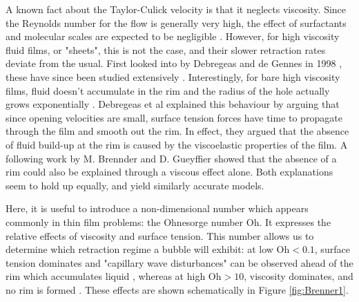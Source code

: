 \documentclass[a4paper,12pt]{article}
\numberwithin{equation}{section}
\numberwithin{figure}{section}
\numberwithin{table}{section}
\begin{document}
A known fact about the Taylor-Culick velocity is that it neglects viscosity. Since the Reynolds number for the flow is generally very high, the effect of surfactants and molecular scales are expected to be negligible \cite{Petit2015, Brenner1999}. However, for high viscosity fluid films, or "sheets", this is not the case, and their slower retraction rates deviate from the usual. First looked into by Debregeas and de Gennes in 1998 \cite{Debregeas1998}, these have since been studied extensively \cite{Brenner1999, Savva2009}. Interestingly, for bare high viscosity films, fluid doesn't accumulate in the rim and the radius of the hole actually grows exponentially \cite{Debregeas1998}. Debregeas et al \cite{Debregeas1998} explained this behaviour by arguing that since opening velocities are small, surface tension forces have time to propagate through the film and smooth out the rim. In effect, they argued that the absence of fluid build-up at the rim is caused by the viscoelastic properties of the film. A following work by M. Brennder and D. Gueyffier \cite{Brenner1999} showed that the absence of a rim could also be explained through a viscous effect alone. Both explanations seem to hold up equally, and yield similarly accurate models.

Here, it is useful to introduce a non-dimensional number which appears commonly in thin film problems: the Ohnesorge number $\mathrm{Oh}$. It expresses the relative effects of viscosity and surface tension. This number allows us to determine which retraction regime a bubble will exhibit: at low $\mathrm{Oh}<0.1$, surface tension dominates and "capillary wave disturbances" can be observed ahead of the rim which accumulates liquid , whereas at high $\mathrm{Oh}>10$, viscosity dominates, and no rim is formed \cite{Savva2009, Brenner1999}. These effects are shown schematically in Figure \ref{fig:Brenner1}.
\end{document}
